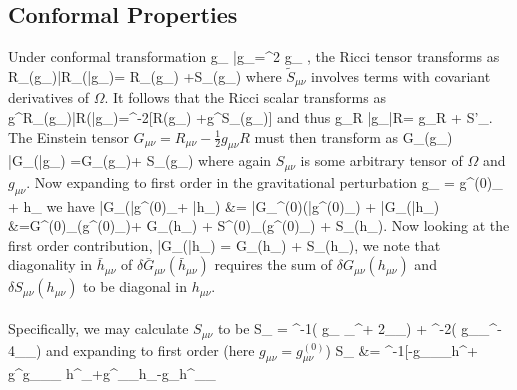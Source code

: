 \documentclass[10pt,letterpaper]{article}
\begin{document}
\subsection{Conformal Properties}
 Under conformal transformation
\be
	g_{\mu\nu} \to \bar g_{\mu\nu}=\Omega^2 g_{\mu\nu} ,
\ee
the Ricci  tensor  transforms as
\be
	R_{\mu\nu}(g_{\mu\nu})\to \bar R_{\mu\nu}(\bar g_{\mu\nu})= R_{\mu\nu}(g_{\mu\nu}) +\tilde S_{\mu\nu}(g_{\mu\nu}) 
\ee
where $\tilde S_{\mu\nu}$ involves terms with covariant derivatives of $\Omega$. It follows that the Ricci scalar transforms as
\be
	g^{\alpha\beta}R_{\alpha\beta}(g_{\mu\nu})\to \bar R(\bar g_{\mu\nu})=\Omega^{-2}[R(g_{\mu\nu})  +g^{\alpha\beta}\tilde S_{\alpha\beta}(g_{\mu\nu})] 
\ee
and thus
\be
	g_{\mu\nu}R \to \bar g_{\mu\nu}\bar R= g_{\mu\nu}R + S'_{\mu\nu}.
\ee
The Einstein tensor $G_{\mu\nu} = R_{\mu\nu} - \frac12 g_{\mu\nu}R$ must then transform as
\be
	G_{\mu\nu}(g_{\mu\nu}) \to \bar G_{\mu\nu}(\bar g_{\mu\nu}) =G_{\mu\nu}(g_{\mu\nu})+ S_{\mu\nu}(g_{\mu\nu})
\ee
where again $S_{\mu\nu}$ is some arbitrary tensor of $\Omega$ and $g_{\mu\nu}$. Now expanding to first order in the gravitational
perturbation
\be
	g_{\mu\nu} = g^{(0)}_{\mu\nu} + h_{\mu\nu}
\ee
we have 
\ba
	\bar G_{\mu\nu}(\bar g^{(0)}_{\mu\nu}+ \bar h_{\mu\nu}) &= \bar G_{\mu\nu}^{(0)}(\bar g^{(0)}_{\mu\nu}) + \delta \bar G_{\mu\nu}(\bar h_{\mu\nu})\\
	&=G^{(0)}_{\mu\nu}(g^{(0)}_{\mu\nu})+ \delta G_{\mu\nu}(h_{\mu\nu}) + S^{(0)}_{\mu\nu}(g^{(0)}_{\mu\nu}) + \delta S_{\mu\nu}(h_{\mu\nu}).
\ea
Now looking at the first order contribution,
\be
	 \delta \bar G_{\mu\nu}(\bar h_{\mu\nu}) =  \delta G_{\mu\nu}(h_{\mu\nu}) + \delta S_{\mu\nu}(h_{\mu\nu}),
\ee
we note that diagonality in $\bar h_{\mu\nu}$ of  $\delta \bar G_{\mu\nu}(\bar h_{\mu\nu})$ requires the sum of $ \delta G_{\mu\nu}(h_{\mu\nu})$ and $\delta S_{\mu\nu}(h_{\mu\nu})$ to be diagonal in $h_{\mu\nu}$. 
\\ \\
Specifically, we may calculate $S_{\mu\nu}$ to be
\be
	S_{\mu\nu} = \Omega^{-1}( g_{\mu\nu} \del_\alpha \del^\alpha \Omega + 2\del_\nu\del_\mu \Omega) + \Omega^{-2}( g_{\mu\nu}\del_\alpha \Omega \del^\alpha\Omega - 4\del_\mu\Omega \del_\nu\Omega)
\ee
and expanding to first order (here $g_{\mu\nu} = g^{(0)}_{\mu\nu}$)
\ba
	\delta S_{\mu\nu} &= \Omega^{-1}[-g_{\mu\nu}\del_\alpha\Omega\del_\beta h^{\alpha\beta}+ g^{\alpha\beta}g_{\mu\nu}\del_\alpha\Omega \del_\beta
h^\gamma{}_\gamma+g^{\alpha\beta}\del_\alpha\Omega \del_\beta h_{\mu\nu}-g_{\mu\nu}h^{\alpha\beta}\del_\beta\del_\alpha \Omega\\
\end{document}
